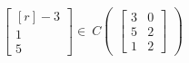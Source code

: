 \documentclass[12 pt]{slides}
\begin{document}
\begingroup
\[ \begin{bmatrix*}[r]-3\\1\\5\end{bmatrix*} \in
\ C\begin{pmatrix}\begin{bmatrix}3&0\\5&2\\1&2\end{bmatrix}\end{pmatrix}\]
\endgroup
\end{document}
